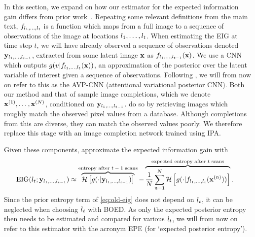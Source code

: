 In this section, we expand on how our estimator for the expected information
gain differs from prior work~\citep{harvey2019near}. Repeating some relevant
definitions from the main text, $f_{l{}_1,\ldots,l{}_t}$ is a function which maps
from a full image to a sequence of observations of the image at locations
$l{}_1,\ldots,l{}_t$. When estimating the EIG at time step $t$, we will have already
observed a sequence of observations denoted $\mathbf{y}{}_{l{}_1,\ldots,l{}_{t-1}}$,
extracted from some latent image $\mathbf{x}{}$ as $f_{l{}_1,\ldots,l{}_{t-1}}(\mathbf{x}{})$. We
use a CNN which outputs $g(v|f_{l{}_1,\ldots,l{}_t}(\mathbf{x}{}))$, an approximation of the
posterior over the latent variable of interest given a sequence of observations.
Following \citet{harvey2019near}, we will from now on refer to this as the
AVP-CNN (attentional variational posterior CNN).
%
Both our method and that of \citet{harvey2019near} sample image completions,
which we denote $\mathbf{x}{}^{(1)},\ldots,\mathbf{x}{}^{(N)}$, conditioned on
$\mathbf{y}{}_{l{}_1,\ldots,l{}_{t-1}}$. \citet{harvey2019near} do so by retrieving
images which roughly match the observed pixel values from a database. Although
completions from this are diverse, they can match the observed values poorly. We
therefore replace this stage with an image completion network trained using
IPA.

Given these components, \citet{harvey2019near} approximate the expected
information gain with
\begin{align}
  \label{eq:old-eig}
  \text{EIG}(l{}_t; \mathbf{y}{}_{l{}_1,\ldots,l{}_{t-1}}) &\approx \overbrace{\mathcal{H} \left[ g(\cdot|\mathbf{y}{}_{l{}_{1},\ldots,l{}_{t-1}}) \right]}^{\text{entropy after $t-1$ scans}} - \overbrace{\frac{1}{N} \sum_{n=1}^N  \mathcal{H} \left[ g(\cdot|f_{l{}_1,\ldots,l{}_t}(\mathbf{x}{}^{(n)})) \right]}^{\text{expected entropy after $t$ scans}}.
\end{align}
Since the prior entropy term of \cref{eq:old-eig} does not depend on $l{}_t$, it
can be neglected when choosing $l{}_t$ with BOED. As only the expected posterior
entropy then needs to be estimated and compared for various $l{}_t$, we will from
now on refer to this estimator with the acronym EPE (for `expected posterior
entropy').

